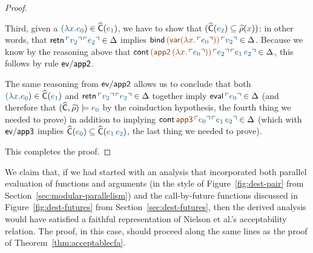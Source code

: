 \begin{proof}
\begin{itemize}
  \medskip Third, given a $\obj{(\lambda x.e_0}) \in \widehat{\sf
    C}(\obj{e_1})$, we have to show that $(\widehat{\sf C}(\obj{e_2})
  \subseteq \widehat{\rho}(\obj{x}))$: in other words, that ${\sf
    retn}\,\interp{v_2}\,\interp{e_2} \in \Delta$ implies ${\sf
    bind}\,\lf{({\sf var}(\lambda x.\,\interp{e_0}))}\,\interp{v_2}
  \in \Delta$.  Because we know by the reasoning above that ${\sf
    cont}\,\lf{({\sf app2}\,(\lf \lambda
    x.\,\interp{e_0}))}\,\interp{e_2}\,\interp{e_1\,e_2} \in \Delta$, this
  follows by rule ${\sf ev/app2}$. 

  \medskip The same reasoning from ${\sf ev/app2}$ 
   allows us to conclude that both $\obj{(\lambda
    x.e_0}) \in \widehat{\sf C}(\obj{e_1})$ and ${\sf
    retn}\,\interp{v_2}\,\interp{e_2} \in \Delta$ together imply ${\sf
    eval}\,\interp{e_0} \in \Delta$ (and therefore that $(\widehat{\sf
    C}, \widehat{\rho}) \models \obj{e_0}$ by the coinduction
  hypothesis, the fourth thing we needed to prove) in addition to implying 
  ${\sf
    cont}\,\lf{\sf app3}\,\interp{e_0}\,\interp{e_1\,e_2} \in \Delta$ (which
  with ${\sf ev/app3}$ implies $\widehat{\sf C}(\obj{e_0}) \subseteq
  \widehat{\sf C}(\obj{e_1\,e_2})$, the last thing we needed to
  prove).
  \end{itemize}

\noindent
This completes the proof.
\end{proof}

We claim that, if we had started with an analysis that incorporated
both parallel evaluation of functions and arguments (in the style of
Figure~\ref{fig:dest-pair} from Section~\ref{sec:modular-parallelism})
and the call-by-future functions discussed in
Figure~\ref{fig:dest-futures} from Section~\ref{sec:dest-futures},
then the derived analysis would have satisfied a faithful
representation of Nielson et al.'s acceptability relation. The proof,
in this case, should proceed along the same lines as the proof of
Theorem~\ref{thm:acceptablecfa}.




